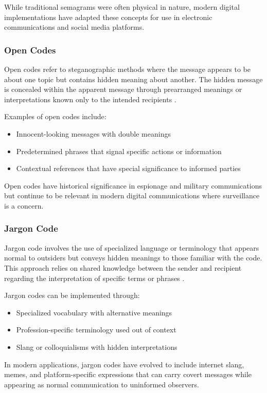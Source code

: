 \documentclass[12pt, a4paper, oneside]{book}
\begin{document}
While traditional semagrams were often physical in nature, modern digital implementations have adapted these concepts for use in electronic communications and social media platforms.

\subsubsection{Open Codes}
Open codes refer to steganographic methods where the message appears to be about one topic but contains hidden meaning about another. The hidden message is concealed within the apparent message through prearranged meanings or interpretations known only to the intended recipients \cite{ShubhamPatel2020}.

Examples of open codes include:
\begin{itemize}[leftmargin=*]
    \item Innocent-looking messages with double meanings
    \item Predetermined phrases that signal specific actions or information
    \item Contextual references that have special significance to informed parties
\end{itemize}

Open codes have historical significance in espionage and military communications but continue to be relevant in modern digital communications where surveillance is a concern.

\subsubsection{Jargon Code}
Jargon code involves the use of specialized language or terminology that appears normal to outsiders but conveys hidden meanings to those familiar with the code. This approach relies on shared knowledge between the sender and recipient regarding the interpretation of specific terms or phrases \cite{ShubhamPatel2020}.

Jargon codes can be implemented through:
\begin{itemize}[leftmargin=*]
    \item Specialized vocabulary with alternative meanings
    \item Profession-specific terminology used out of context
    \item Slang or colloquialisms with hidden interpretations
\end{itemize}

In modern applications, jargon codes have evolved to include internet slang, memes, and platform-specific expressions that can carry covert messages while appearing as normal communication to uninformed observers.
\end{document}
